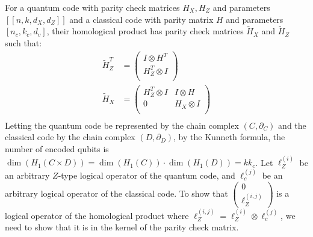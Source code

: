 \documentclass{article}
\begin{document}
For a quantum code with parity check matrices $H_X, H_Z$ and parameters $[[n, k, d_X, d_Z]]$ and a classical code with parity matrix $H$ and parameters $[n_c, k_c, d_v]$, their homological product has parity check matrices $\tilde{H}_X$ and $\tilde{H}_Z$ such that:
\begin{align*}
    \tilde{H}_Z^T & = \begin{pmatrix}
        I \otimes H^T \\
        H_Z^T \otimes I \\
    \end{pmatrix} \\
    \tilde{H}_X & = \begin{pmatrix}
        H_Z^T \otimes I & I \otimes H \\
        0 & H_X \otimes I \\
    \end{pmatrix} \\
\end{align*}
Letting the quantum code be represented by the chain complex $(C, \partial_C)$ and the classical code by the chain complex $(D, \partial_D)$, by the Kunneth formula, the number of encoded qubits is $\dim(H_1(C \times D)) = \dim(H_1(C)) \cdot \dim(H_1(D)) = kk_c$.
Let $\ell_Z^{(i)}$ be an arbitrary $Z$-type logical operator of the quantum code, and $\ell_c^{(j)}$ be an arbitrary logical operator of the classical code. To show that $\begin{pmatrix} 0 \\ \ell_Z^{(i, j)}\end{pmatrix}$ is a logical operator of the homological product where $\ell_Z^{(i,j)} = \ell_Z^{(i)} \otimes \ell_c^{(j)}$, we need to show that it is in the kernel of the parity check matrix.
\end{document}
